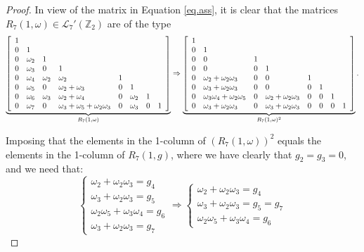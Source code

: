 \documentclass[10pt,a4paper]{amsart}
\begin{document}
\begin{proof} 
In view of the matrix in Equation \eqref{eq.ass}, it is clear that the matrices $R_{7}(1,\omega) \in \mathcal L_7'(\mathbb Z_2)$ are of the type
\begin{eqnarray*} 
\underbrace{\left[\begin{array}{l l l l l l l l} 1& & & & & & & \\ 0& 1& & & & & & \\
0&\omega_2 &1 & & & & & \\
0&\omega_3 &0 &1 & & & & \\
0& \omega_4&\omega_2 & \omega_2&1 & & & \\
0&\omega_5 &0 &\omega_2+\omega_3 & 0&1 & & \\
0&\omega_6 & \omega_3&\omega_2+\omega_4 & 0 & \omega_2&1 & \\
0&\omega_7 &0 &\omega_3+\omega_5+\omega_2\omega_3 &0 &\omega_3 & 0&1 \\
 \end{array}\right]}_{R_{7}(1,\omega)} \Rightarrow 
\underbrace{\left[\begin{array}{l l l l l l l l} 
1& & & & & & & \\ 
0& 1& & & & & & \\
0& 0 &1 & & & & & \\
0&0 &0 &1 & & & & \\
0& \omega_{2} + \omega_2 \omega_3& 0 & 0&1 & & & \\
0&\omega_{3} + \omega_2 \omega_3 &0 &0 & 0&1 & & \\
0& \omega_3 \omega_4 + \omega_2 \omega_5 & 0 & \omega_{2} + \omega_2 \omega_3 & 0 & 0&1 & \\
0&\omega_{3} + \omega_2 \omega_{3}&0 & \omega_{3} + \omega_{2}\omega_{3} &0 &0 & 0&1 \\
\end{array}\right]}_{R_{7}(1,\omega)^2}  .\end{eqnarray*} 

\noindent Imposing that the elements in the 1-column of $(R_7(1,\omega))^2$ equals the elements in the 1-column of $R_7(1,g)$, where we have clearly that $g_2 = g_3 = 0$, and we need that:
$$\begin{cases}\omega_2+\omega_2\omega_3=g_4\\ 
\omega_3+\omega_2\omega_3=g_5 \\
\omega_2\omega_5+\omega_3\omega_4=g_6 \\
\omega_3+\omega_2\omega_3=g_7\end{cases} \Longrightarrow \begin{cases}\omega_2+\omega_2\omega_3=g_4\\ 
\omega_3+\omega_2\omega_3=g_5=g_7 \\
\omega_2\omega_5+\omega_3\omega_4=g_6 \end{cases}$$


\end{proof}
\end{document}
